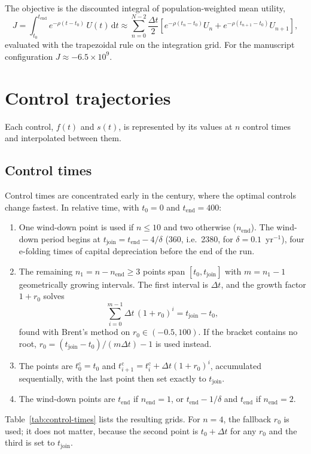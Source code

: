 \documentclass[11pt]{article}
\newcommand{\dd}{\mathrm{d}}
\newcommand{\tc}{t^{\mathrm{c}}}
\begin{document}
The objective is the discounted integral of population-weighted mean utility,
\begin{equation}
  J = \int_{t_0}^{t_{\mathrm{end}}} e^{-\rho(t-t_0)}\,U(t)\,\dd t
    \approx \sum_{n=0}^{N-2}\frac{\Delta t}{2}
    \left[e^{-\rho(t_n-t_0)}U_n + e^{-\rho(t_{n+1}-t_0)}U_{n+1}\right],
  \label{eq:objective}
\end{equation}
evaluated with the trapezoidal rule on the integration grid. For the
manuscript configuration $J\approx -6.5\times10^{9}$.

\section{Control trajectories}
\label{sec:controls}

Each control, $f(t)$ and $s(t)$, is represented by its values at $n$ control
times and interpolated between them.

\subsection{Control times}
\label{sec:control-times}

Control times are concentrated early in the century, where the optimal
controls change fastest. In relative time, with $t_0 = 0$ and
$t_{\mathrm{end}} = 400$:
\begin{enumerate}
  \item One wind-down point is used if $n\le10$ and two otherwise
  ($n_{\mathrm{end}}$). The wind-down period begins at
  $t_{\mathrm{join}} = t_{\mathrm{end}} - 4/\delta$ (360, i.e.\ 2380, for
  $\delta = 0.1$~yr$^{-1}$), four e-folding times of capital depreciation
  before the end of the run.
  \item The remaining $n_1 = n - n_{\mathrm{end}}\ge3$ points span
  $[t_0, t_{\mathrm{join}}]$ with $m = n_1 - 1$ geometrically growing
  intervals. The first interval is $\Delta t$, and the growth factor
  $1 + r_0$ solves
  \begin{equation}
    \sum_{i=0}^{m-1}\Delta t\,(1+r_0)^i = t_{\mathrm{join}} - t_0 ,
  \end{equation}
  found with Brent's method on $r_0\in(-0.5, 100)$. If the bracket contains no
  root, $r_0 = (t_{\mathrm{join}}-t_0)/(m\Delta t) - 1$ is used instead.
  \item The points are $\tc_0 = t_0$ and $\tc_{i+1} = \tc_i + \Delta t
  (1+r_0)^i$, accumulated sequentially, with the last point then set exactly to
  $t_{\mathrm{join}}$.
  \item The wind-down points are $t_{\mathrm{end}}$ if $n_{\mathrm{end}}=1$, or
  $t_{\mathrm{end}} - 1/\delta$ and $t_{\mathrm{end}}$ if $n_{\mathrm{end}}=2$.
\end{enumerate}
Table~\ref{tab:control-times} lists the resulting grids. For $n=4$, the
fallback $r_0$ is used; it does not matter, because the second point is
$t_0 + \Delta t$ for any $r_0$ and the third is set to $t_{\mathrm{join}}$.
\end{document}
